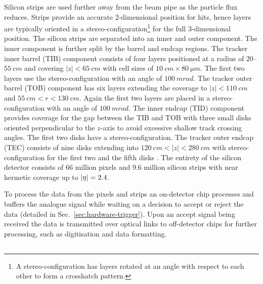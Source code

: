Silicon strips are used further away from the beam pipe as the particle flux
reduces. Strips provide an accurate 2-dimensional position for hits, hence
layers are typically oriented in a stereo-configuration\footnote{A
stereo-configuration has layers rotated at an angle with respect to each other
to form a crosshatch pattern.} for the full 3-dimensional position. The
silicon strips are separated into an inner and outer component. The inner
component is further split by the barrel and endcap regions. The tracker inner
barrel (TIB) component consists of four layers positioned at a radius of
$20$--${\SI{55}{cm}}$ and covering ${|z|<\SI{65}{cm}}$ with cell sizes of
${\SI{10}{cm}\times\SI{80}{\micro m}}$. The first two layers use the
stereo-configuration with an angle of ${\SI{100}{mrad}}$. The tracker outer
barrel (TOB) component has six layers extending the coverage to
${|z|<\SI{110}{cm}}$ and ${\SI{55}{cm}<r<\SI{130}{cm}}$. Again the first two 
layers are placed in a stereo-configuration with an angle of
${\SI{100}{mrad}}$. The inner endcap (TID) component provides coverage for the
gap between the TIB and TOB with three small disks oriented perpendicular to
the $z$-axis to avoid excessive shallow track crossing angles. The first two
disks have a stereo-configuration. The tracker outer endcap (TEC) consists of
nine disks extending into ${\SI{120}{cm}<|z|<\SI{280}{cm}}$ with
stereo-configuration for the first two  and the fifth disks
\cite{Borrello:687861}. The entirety of the silicon detector consists of 66
million pixels and 9.6 million silicon strips with near hermetic coverage up
to $|\eta|=2.4$.

To process the data from the pixels and strips an on-detector chip processes
and buffers the analogue signal while waiting on a decision to accept or
reject the data (detailed in Sec.~\ref{sec:hardware-trigger}). Upon an accept
signal being received the data is transmitted over optical links to
off-detector chips for further processing, such as digitisation and data
formatting.


\subsection{\ECAL}

